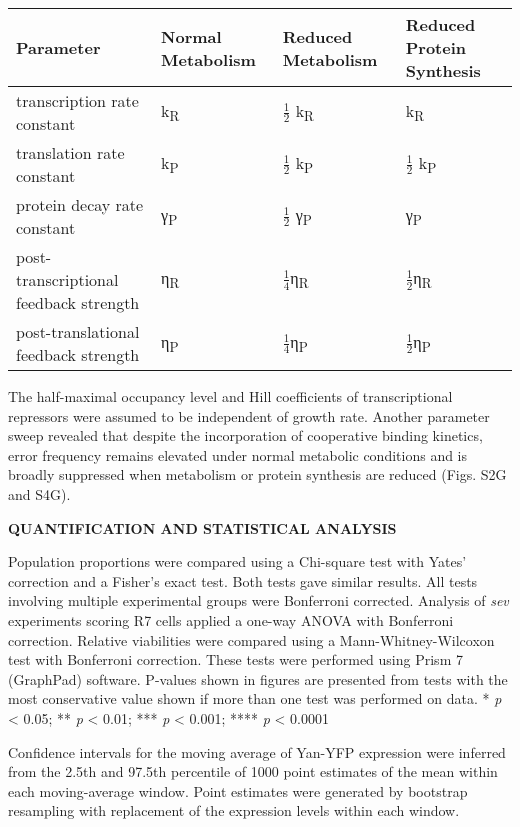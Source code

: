 \begin{longtable}[]{@{}llll@{}}
\toprule
\textbf{Parameter} & \textbf{Normal Metabolism} & \textbf{Reduced Metabolism} & \textbf{Reduced Protein Synthesis}\tabularnewline
\midrule
\endhead
transcription rate constant & k\textsubscript{R} & \(\frac{1}{2}\) k\textsubscript{R} & k\textsubscript{R}\tabularnewline
translation rate constant & k\textsubscript{P} & \(\frac{1}{2}\) k\textsubscript{P} & \(\frac{1}{2}\) k\textsubscript{P}\tabularnewline
protein decay rate constant & γ\textsubscript{P} & \(\frac{1}{2}\) γ\textsubscript{P} & γ\textsubscript{P}\tabularnewline
post-transcriptional feedback strength & η\textsubscript{R} & \(\frac{1}{4}\)η\textsubscript{R} & \(\frac{1}{2}\)η\textsubscript{R}\tabularnewline
post-translational feedback strength & η\textsubscript{P} & \(\frac{1}{4}\)η\textsubscript{P} & \(\frac{1}{2}\)η\textsubscript{P}\tabularnewline
\bottomrule
\end{longtable}

The half-maximal occupancy level and Hill coefficients of transcriptional repressors were assumed to be independent of growth rate. Another parameter sweep revealed that despite the incorporation of cooperative binding kinetics, error frequency remains elevated under normal metabolic conditions and is broadly suppressed when metabolism or protein synthesis are reduced (Figs. S2G and S4G).

\textbf{QUANTIFICATION AND STATISTICAL ANALYSIS }

Population proportions were compared using a Chi-square test with Yates' correction and a Fisher's exact test. Both tests gave similar results. All tests involving multiple experimental groups were Bonferroni corrected. Analysis of \emph{sev} experiments scoring R7 cells applied a one-way ANOVA with Bonferroni correction. Relative viabilities were compared using a Mann-Whitney-Wilcoxon test with Bonferroni correction. These tests were performed using Prism 7 (GraphPad) software. P-values shown in figures are presented from tests with the most conservative value shown if more than one test was performed on data. * \emph{p} \textless{} 0.05; ** \emph{p} \textless{} 0.01; *** \emph{p} \textless{} 0.001; **** \emph{p} \textless{} 0.0001

Confidence intervals for the moving average of Yan-YFP expression were inferred from the 2.5th and 97.5th percentile of 1000 point estimates of the mean within each moving-average window. Point estimates were generated by bootstrap resampling with replacement of the expression levels within each window.

